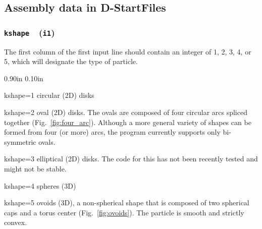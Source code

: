 \documentclass[letterpaper,11pt]{article}
\newcommand{\Var}[2]{\texttt{#1}\ \  (\texttt{#2})}
\newcommand{\StartFile}{\textsf{StartFile}}
\newlength{\Labelwidth}
\newcommand{\Entrylabel}[1]{\makebox[\Labelwidth][r]{\texttt{#1}}}
\newenvironment{Options}
{\begin{list}{}{%
\renewcommand{\makelabel}{\Entrylabel}%
\setlength{\leftmargin} {0.90in}%
\setlength{\rightmargin}{0.00in}%
\setlength{\labelsep}   {0.10in}%
\setlength{\labelwidth} {\Labelwidth}%
}}
{\end{list}}
\begin{document}
\subsection{Assembly data in D-\StartFile s}\label{sec:StartFile1}
\subsubsection[\texttt{kshape}]{\Var{kshape}{i1}}\label{sec:kshape}
The first column of the first input line should contain
an integer of 1, 2, 3, 4, or 5, which will designate the type of particle.
\begin{Options}
\item[kshape=1]
circular (2D) disks
\item[kshape=2]
oval (2D) disks.  The ovals are composed of four circular arcs spliced 
together (Fig.~\ref{fig:four_arc}).  
Although a more general variety of shapes can be formed from
four (or more) arcs, the program currently supports only bi-symmetric
ovals.
\item[kshape=3]
elliptical (2D) disks.  The code for this has not been recently tested
and might not be stable.
\item[kshape=4]
spheres (3D)
\item[kshape=5]
ovoids (3D), a non-spherical shape that is composed
of two spherical caps and a torus center (Fig.~\ref{fig:ovoids}).
The particle is smooth and strictly convex.
\begin{figure}
\centering
{}\quad%
\subfigure[Prolate]

\end{figure}
\end{Options}
\end{document}

